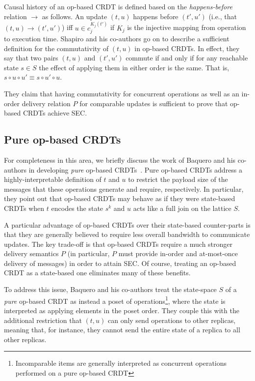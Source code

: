 Causal history of an op-based CRDT is defined based on the
\textit{happens-before} relation $\to$ as follows. An update $(t,u)$ happens
before $(t',u')$ (i.e., that $(t, u) \to (t', u')$) iff $u \in c_{j}^{K_j(t')}$
if $K_j$ is the injective mapping from operation to execution time. Shapiro and
his co-authors go on to describe a sufficient definition for the commutativity
of $(t,u)$ in op-based CRDTs. In effect, they say that two pairs $(t,u)$ and
$(t',u')$ commute if and only if for any reachable state $s \in S$ the effect of
applying them in either order is the same. That is, $s \circ u \circ u' \equiv s
\circ u' \circ u$.

They claim that having commutativity for concurrent operations as well as an
in-order delivery relation $P$ for comparable updates is sufficient to prove
that op-based CRDTs achieve SEC.

\subsection{Pure op-based CRDTs}

For completeness in this area, we briefly discuss the work of Baquero and his
co-authors in developing \textit{pure} op-based CRDTs~\citep{baquero17}. Pure
op-based CRDTs address a highly-interpretable definition of $t$ and $u$ to
restrict the payload size of the messages that these operations generate and
require, respectively. In particular, they point out that op-based CRDTs may
behave as if they were state-based CRDTs when $t$ encodes the state $s^k$ and
$u$ acts like a full join on the lattice $S$.

A particular advantage of op-based CRDTs over their state-based counter-parts is
that they are generally believed to require less overall bandwidth to
communicate updates. The key trade-off is that op-based CRDTs require a much
stronger delivery semantics $P$ (in particular, $P$ must provide in-order and
at-most-once delivery of messages) in order to attain SEC. Of course, treating
an op-based CRDT as a state-based one eliminates many of these benefits.

To address this issue, Baquero and his co-authors treat the state-space $S$ of
a \emph{pure} op-based CRDT as instead a poset of
operations\footnote{Incomparable items are generally interpreted as concurrent
operations performed on a pure op-based CRDT}, where the state is interpreted as
applying elements in the poset order. They couple this with the additional
restriction that $(t,u)$ can only send operations to other replicas, meaning
that, for instance, they cannot send the entire state of a replica to all other
replicas.

